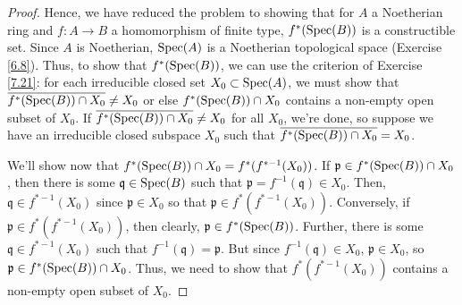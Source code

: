 \begin{proof}
Hence, we have reduced the problem to showing that for $A$ a Noetherian ring and $f : A \to B$ a homomorphism of finite type, $f^*(\operatorname{Spec}(B))$ is a constructible
set. Since $A$ is Noetherian, $\operatorname{Spec}(A)$ is a Noetherian topological space (Exercise \ref{6.8}). Thus, to show that $f^*(\operatorname{Spec}(B))$, we can use the criterion
of Exercise \ref{7.21}: for each irreducible closed set $X_0 \subset \operatorname{Spec}(A)$, we must show that $\overline{f^*(\operatorname{Spec}(B)) \cap X_0} \neq X_0$ or else
$f^*(\operatorname{Spec}(B)) \cap X_0$ contains a non-empty open subset of $X_0$. If $\overline{f^*(\operatorname{Spec}(B)) \cap X_0} \neq X_0$ for all $X_0$, we're done, so suppose we 
have an irreducible closed subspace $X_0$ such that $\overline{f^*(\operatorname{Spec}(B)) \cap X_0} = X_0$. 

We'll show now that $f^*(\operatorname{Spec}(B)) \cap X_0 = f^*(f^{*-1}(X_0))$. If $\mathfrak{p} \in f^*(\operatorname{Spec}(B)) \cap X_0$, then there is some $\mathfrak{q} \in \operatorname{Spec}(B)$ such that
$\mathfrak{p} = f^{-1}(\mathfrak{q}) \in X_0$. Then, $\mathfrak{q} \in f^{*-1}(X_0)$ since $\mathfrak{p} \in X_0$ so that $\mathfrak{p} \in f^*(f^{*-1}(X_0))$. Conversely,
if $\mathfrak{p} \in f^*(f^{*-1}(X_0))$, then clearly, $\mathfrak{p} \in f^*(\operatorname{Spec}(B))$. Further, there is some $\mathfrak{q} \in f^{*-1}(X_0)$ such that 
$f^{-1}(\mathfrak{q}) = \mathfrak{p}$. But since $f^{-1}(\mathfrak{q}) \in X_0$, $\mathfrak{p} \in X_0$, so $\mathfrak{p} \in f^*(\operatorname{Spec}(B)) \cap X_0$. Thus, we 
need to show that $f^*(f^{*-1}(X_0))$ contains a non-empty open subset of $X_0$.


\end{proof}
